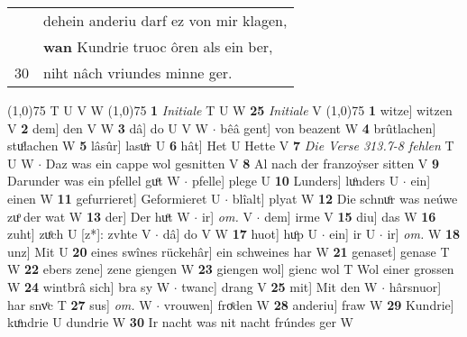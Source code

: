 \documentclass[8pt,a4paper,notitlepage]{article}
\begin{document}
\begin{table}[ht]
\begin{minipage}[t]{0.5\linewidth}
\begin{tabular}{rl}
 & dehein anderiu darf ez von mir klagen,\\ 
 & \textbf{wan} Kundrie truoc ôren als ein ber,\\ 
30 & niht nâch vriundes minne ger.\\ 
\end{tabular}
\scriptsize
\line(1,0){75} \newline
T U V W \newline
\line(1,0){75} \newline
\textbf{1} \textit{Initiale} T U W  \textbf{25} \textit{Initiale} V  \newline
\line(1,0){75} \newline
\textbf{1} witze] witzen V \textbf{2} dem] den V W \textbf{3} dâ] do U V W  $\cdot$ bêâ gent] von beazent W \textbf{4} brûtlachen] stuͦlachen W \textbf{5} lâsûr] lasuͦr U \textbf{6} hât] Het U Hette V \textbf{7} \textit{Die Verse 313.7-8 fehlen} T U W   $\cdot$ Daz was ein cappe wol gesnitten V \textbf{8} Al nach der franzoẏser sitten V \textbf{9} Darunder was ein pfellel guͦt W  $\cdot$ pfelle] plege U \textbf{10} Lunders] luͦnders U  $\cdot$ ein] einen W \textbf{11} gefurrieret] Geformieret U  $\cdot$ blîalt] plyat W \textbf{12} Die schnuͦr was neúwe zuͦ der wat W \textbf{13} der] Der huͦt W  $\cdot$ ir] \textit{om.} V  $\cdot$ dem] irme V \textbf{15} diu] das W \textbf{16} zuht] zuͦch U [z*]: zvhte V  $\cdot$ dâ] do V W \textbf{17} huot] huͦp U  $\cdot$ ein] ir U  $\cdot$ ir] \textit{om.} W \textbf{18} unz] Mit U \textbf{20} eines swînes rückehâr] ein schweines har W \textbf{21} genaset] genase T W \textbf{22} ebers zene] zene giengen W \textbf{23} giengen wol] gienc wol T Wol einer grossen W \textbf{24} wintbrâ sich] bra sy W  $\cdot$ twanc] drang V \textbf{25} mit] Mit den W  $\cdot$ hârsnuor] har snvͦc T \textbf{27} sus] \textit{om.} W  $\cdot$ vrouwen] froͤden W \textbf{28} anderiu] fraw W \textbf{29} Kundrie] kuͦndrie U dundrie W \textbf{30} Ir nacht was nit nacht frúndes ger W \newline
\end{minipage}
\end{table}
\end{document}
